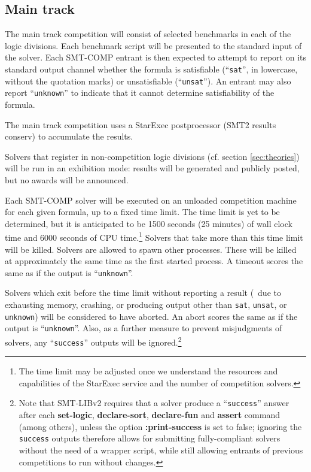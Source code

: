 \documentclass[12pt]{article}
\newcommand{\akey}[1]{\textbf{#1}}
\begin{document}
\subsection{Main track}
\label{sec:exec:main}

The main track competition will consist of selected benchmarks in each of the
logic divisions.
Each benchmark script will be presented to the standard input of the solver.
Each SMT-COMP entrant is then expected to attempt to report on its
standard output channel whether the formula is satisfiable
(``\texttt{sat}'', in lowercase, without the quotation marks) or unsatisfiable
(``\texttt{unsat}'').  An entrant may also report ``\texttt{unknown}''
to indicate that it cannot determine satisfiability of the formula.

The main track competition uses a StarExec postprocessor (SMT2 results conserv) to accumulate the results.

Solvers that register in non-competition logic divisions (cf. section \ref{sec:theories})
will be run in an exhibition mode: results will be generated and publicly
posted, but no awards will be announced.

Each SMT-COMP solver will be executed on an
unloaded competition machine for each given formula, up to a fixed
time limit.  The time limit is yet to be determined, but it is
anticipated to be 1500 seconds (25 minutes) of wall clock time and 6000 seconds of CPU time.\footnote{The time limit may be adjusted once we understand the resources and capabilities of the StarExec service and the number of competition solvers.} 
Solvers that take more than this
time limit will be killed.  Solvers are allowed to spawn other
processes.  These will be killed at approximately the same time as the
first started process.  A
timeout scores the same as if the output is ``\texttt{unknown}''.


Solvers which exit before the time
limit without reporting a result (\ie\ due to exhausting memory, crashing,
or producing output other than \texttt{sat}, \texttt{unsat}, or
\texttt{unknown})
will be considered to have aborted. 
An abort scores the same as if the output is ``\texttt{unknown}''. 
Also, as a further measure to prevent misjudgments of solvers,
any  ``\texttt{success}'' outputs will be 
ignored.\footnote{
Note that SMT-LIBv2 requires that a solver produce a ``\texttt{success}'' answer
after each \akey{set-logic}, \akey{declare-sort}, \akey{declare-fun} and
\akey{assert} command (among others), unless the option
\akey{:print-success} is set to false; ignoring the
\texttt{success} outputs therefore allows for submitting fully-compliant
solvers without the need of a wrapper script, while still allowing entrants
of previous competitions to run without changes.}
\end{document}

